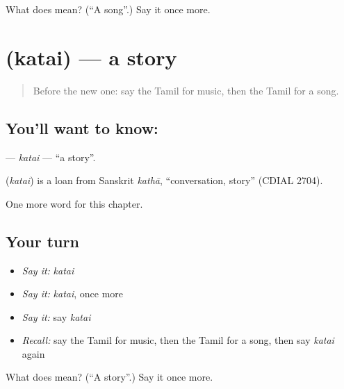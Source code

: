 \begin{tcolorbox}[breakable,colback=teal!4,colframe=teal!35!black,title={Before you move on}]
What does  mean? (\textquotedblleft{}A song\textquotedblright{}.) Say it once more.
\end{tcolorbox}
\section[\texorpdfstring{\ta{கதை} (katai)}{கதை (katai)}]{ (katai) — a story}

\label{lesson:TA-C274-katai}



\begin{quote}
Before the new one: say the Tamil for music, then the Tamil for a song.
\end{quote}

\subsection*{You'll want to know: }
\textbf{} — \emph{katai} — \textquotedblleft{}a story\textquotedblright{}.

\begin{cousinweb}
\textbf{} (\emph{katai}) is a loan from Sanskrit \emph{kathā}, \textquotedblleft{}conversation, story\textquotedblright{} (CDIAL 2704).
\end{cousinweb}

\begin{grammarlens}[title={What you've built}]
One more word for this chapter.
\end{grammarlens}

\subsection*{Your turn}
\begin{itemize}
\raggedright
  \item \emph{Say it:} \emph{katai}
  \item \emph{Say it:} \emph{katai}, once more
  \item \emph{Say it:} say \emph{katai}
  \item \emph{Recall:} say the Tamil for music, then the Tamil for a song, then say \emph{katai} again
\end{itemize}

\begin{tcolorbox}[breakable,colback=teal!4,colframe=teal!35!black,title={Before you move on}]
What does  mean? (\textquotedblleft{}A story\textquotedblright{}.) Say it once more.
\end{tcolorbox}
